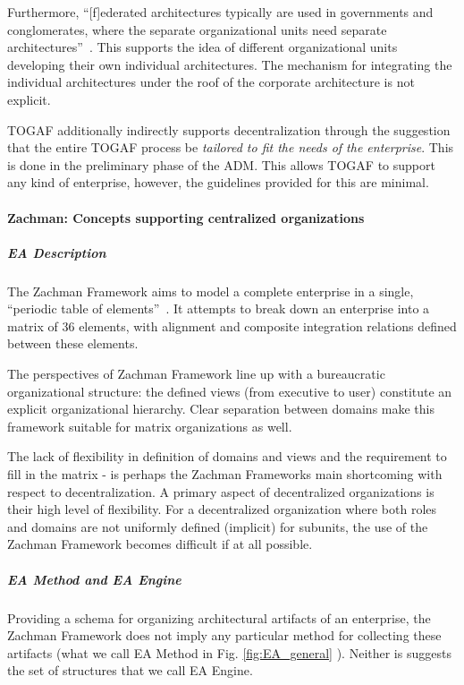 Furthermore, ``[f]ederated architectures typically are used in governments and conglomerates, where the separate organizational units need separate architectures''~\cite[Ch. 40.3]{togaf9.1}. This supports the idea of different organizational units developing their own individual architectures. The mechanism for integrating the individual architectures under the roof of the corporate architecture is not explicit. 

TOGAF additionally indirectly supports decentralization through the suggestion that the entire TOGAF process be\textit{ tailored to fit the needs of the enterprise}. This is done in the preliminary phase of the ADM. This allows TOGAF to support any kind of enterprise, however, the guidelines provided for this are minimal. 

\paragraph*{Zachman: Concepts supporting centralized organizations}
\subparagraph*{EA Description}
The Zachman Framework aims to model a complete enterprise in a single, ``periodic table of elements''~\cite{Bente2012}. It attempts to break down an enterprise into a matrix of 36 elements, with alignment and composite integration relations defined between these elements. 

The perspectives of Zachman Framework line up with a bureaucratic organizational structure: the defined views (from executive to user) constitute an explicit organizational hierarchy. Clear separation between domains make this framework suitable for matrix organizations as well. 

The lack of flexibility in definition of domains and views and the requirement to fill in the matrix - is perhaps the Zachman Frameworks main shortcoming with respect to decentralization. A primary aspect of decentralized organizations is their high level of flexibility. For a decentralized organization where both roles and domains are not uniformly defined (implicit) for subunits, the use of the Zachman Framework becomes difficult if at all possible.

\subparagraph*{EA Method and EA Engine}

Providing a schema for organizing architectural artifacts of an enterprise, the Zachman Framework does not imply any particular method for collecting these artifacts (what we call EA Method in Fig. \ref{fig:EA_general} ).
Neither is suggests the set of structures that we call EA Engine. 

